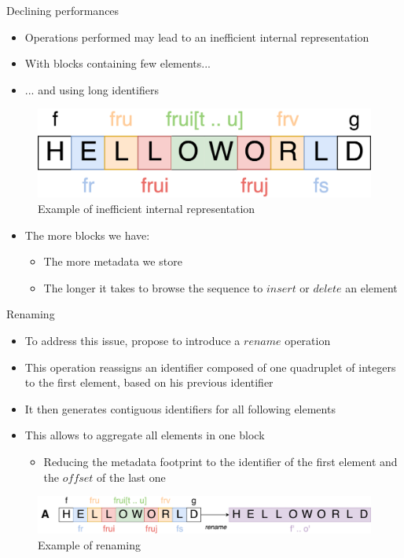 \documentclass[10pt]{beamer}
\begin{document}
\begin{frame}{Declining performances}
  \begin{itemize}
    \item Operations performed may lead to an inefficient internal representation
    \item With blocks containing few elements...
    \item ... and using long identifiers
  \end{itemize}
  \begin{figure}
    \includegraphics[scale=0.15]{img/worst-case.png}
    \caption{Example of inefficient internal representation}
  \end{figure}
  \begin{itemize}
    \item The more blocks we have:
    \begin{itemize}
      \item The more metadata we store
      \item The longer it takes to browse the sequence to $insert$ or $delete$ an element
    \end{itemize}
  \end{itemize}
\end{frame}

\begin{frame}{Renaming}
  \begin{itemize}
    \item To address this issue, propose to introduce a $rename$ operation
    \item This operation reassigns an identifier composed of one quadruplet of integers to the first element, based on his previous identifier
    \item It then generates contiguous identifiers for all following elements
    \item This allows to aggregate all elements in one block
    \begin{itemize}
      \item Reducing the metadata footprint to the identifier of the first element and the $offset$ of the last one
    \end{itemize}
  \end{itemize}
  \begin{figure}
    \includegraphics[scale=0.11]{img/renaming.png}
    \caption{Example of renaming}
  \end{figure}
\end{frame}
\end{document}
